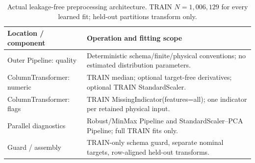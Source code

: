 \documentclass[conference]{IEEEtran}
\begin{document}
\begin{table}[!t]
\caption{Actual leakage-free preprocessing architecture. TRAIN $N=1{,}006{,}129$ for every learned fit; held-out partitions transform only.}\label{tab:architecture}
\centering\footnotesize
\begin{tabularx}{\columnwidth}{YY}
\toprule
Location / component & Operation and fitting scope \\ \midrule
Outer Pipeline: quality & Deterministic schema/finite/physical conventions; no estimated distribution parameters. \\
ColumnTransformer: numeric & TRAIN median; optional target-free derivatives; optional TRAIN StandardScaler. \\
ColumnTransformer: flags & TRAIN MissingIndicator(features=all); one indicator per retained physical input. \\
Parallel diagnostics & Robust/MinMax Pipeline and StandardScaler--PCA Pipeline; full TRAIN fits only. \\
Guard / assembly & TRAIN-only schema guard, separate nominal targets, row-aligned held-out transforms. \\
\bottomrule
\end{tabularx}
\end{table}
\end{document}
